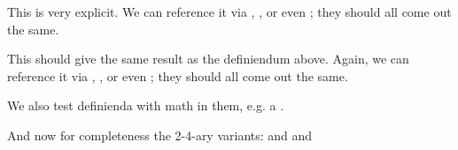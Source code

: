 \documentclass[minimal]{omdoc}
\begin{document}
\begin{module}[name=foomod]
  \begin{definition}[id=test.one]
    This  is very explicit. We can reference
    it via , , or even
    ; they should all come out the same.
  \end{definition}

  \begin{definition}[id=test.two]
    This  should give the same result as the
    definiendum above. Again, we can reference it via ,
    , or even ; they should
    all come out the same.
  \end{definition}

 \begin{definition}
   We also test definienda with math in them, e.g. a
   .

   And now for completeness the 2-4-ary variants: 
   and  and 
 \end{definition}
\end{module}
\end{document}
